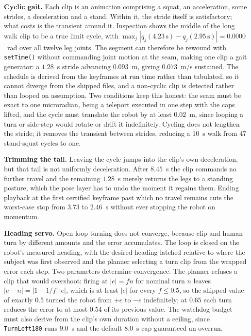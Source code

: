 \documentclass[twocolumn]{article}
\begin{document}
\textbf{Cyclic gait.} Each clip is an animation comprising a squat, an acceleration, some
strides, a deceleration and a stand. Within it, the stride itself is satisfactory; what costs
is the transient around it. Inspection shows the middle of the long walk clip to be a true
limit cycle, with
$\max_j |q_j(4.23\,\mathrm{s}) - q_j(2.95\,\mathrm{s})| = 0.0000$~rad over all twelve leg
joints. The segment can therefore be rewound with \texttt{setTime()} without commanding joint
motion at the seam, making one clip a gait generator: a $1.28$~s stride advancing $0.093$~m,
giving $0.073$~m/s sustained. The schedule is derived from the keyframes at run time rather than tabulated, so it cannot
diverge from the shipped files, and a non-cyclic clip is detected rather than looped on
assumption. Two conditions keep this honest: the seam must be exact to one microradian, being a
teleport executed in one step with the caps lifted, and the cycle must translate the robot by
at least $0.02$~m, since looping a turn or side-step would rotate or drift it indefinitely.
Cycling does not lengthen the stride; it removes the transient between strides, reducing a
$10$~s walk from 47 stand-squat cycles to one.

\textbf{Trimming the tail.} Leaving the cycle jumps into the clip's own deceleration, but that
tail is not uniformly deceleration. After $8.45$~s the clip commands no further travel and the
remaining $1.28$~s merely returns the legs to a standing posture, which the pose layer has to
undo the moment it regains them. Ending playback at the first certified keyframe past which no
travel remains cuts the worst-case stop from $3.73$ to $2.46$~s without ever stopping the robot
on momentum.

\textbf{Heading servo.} Open-loop turning does not converge, because clip and human turn by
different amounts and the error accumulates. The loop is closed on the robot's measured
heading, with the desired heading latched relative to where the subject was first observed and
the planner selecting a turn clip from the wrapped error each step. Two parameters determine
convergence. The planner refuses a clip that would overshoot: firing at $|e| = f n$ for nominal
turn $n$ leaves $|e - n| = |1 - 1/f|\,|e|$, which is at least $|e|$ for every $f \le 0.5$, so
the shipped value of exactly $0.5$ turned the robot from $+e$ to $-e$ indefinitely; at $0.65$
each turn reduces the error to at most $0.54$ of its previous value. The watchdog budget must
also derive from the clip's own duration without a ceiling, since \texttt{TurnLeft180} runs
$9.0$~s and the default $8.0$~s cap guaranteed an overrun.
\end{document}
